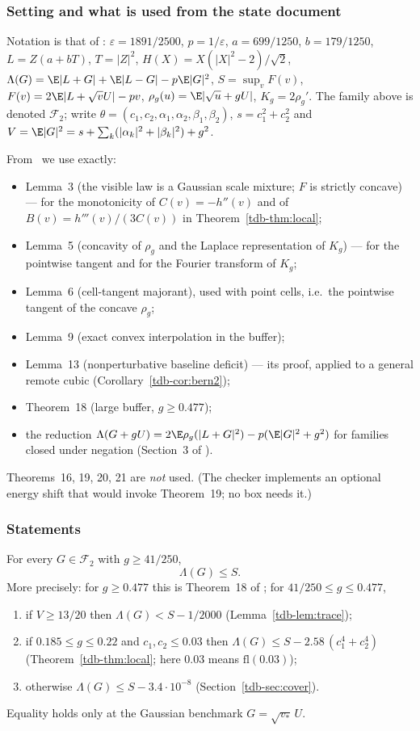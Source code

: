 \subsubsection{Setting and what is used from the state document}
Notation is that of \Sd: $\varepsilon=1891/2500$, $p=1/\varepsilon$, $a=699/1250$, $b=179/1250$, $L=Z(a+bT)$, $T=|Z|^2$,
$H(X)=X(|X|^2-2)/\sqrt2$, $\Lambda(G)=\E|L+G|+\E|L-G|-p\E|G|^2$, $S=\sup_vF(v)$, $F(v)=2\E|L+\sqrt vU|-pv$,
$\rho_g(u)=\E|\sqrt u+gU|$, $K_g=2\rho_g'$. The family above is denoted $\mathcal F_2$; write $\theta=(c_1,c_2,\alpha_1,\alpha_2,\beta_1,\beta_2)$,
$s=c_1^2+c_2^2$ and $V=\E|G|^2=s+\sum_k(|\alpha_k|^2+|\beta_k|^2)+g^2$.

From \Sd\ we use exactly:
\begin{itemize}
\item Lemma~3 (the visible law is a Gaussian scale mixture; $F$ is strictly concave) --- for the monotonicity of $C(v)=-h''(v)$ and
of $B(v)=h'''(v)/(3C(v))$ in Theorem~\ref{tdb-thm:local};
\item Lemma~5 (concavity of $\rho_g$ and the Laplace representation of $K_g$) --- for the pointwise tangent and for the Fourier transform of $K_g$;
\item Lemma~6 (cell-tangent majorant), used with point cells, i.e.\ the pointwise tangent of the concave $\rho_g$;
\item Lemma~9 (exact convex interpolation in the buffer);
\item Lemma~13 (nonperturbative baseline deficit) --- its proof, applied to a general remote cubic (Corollary~\ref{tdb-cor:bern2});
\item Theorem~18 (large buffer, $g\ge0.477$);
\item the reduction $\Lambda(G+gU)=2\E\rho_g(|L+G|^2)-p(\E|G|^2+g^2)$ for families closed under negation (Section~3 of \Sd).
\end{itemize}
Theorems~16, 19, 20, 21 are \emph{not} used. (The checker implements an optional energy shift that would invoke Theorem~19; no box needs it.)

\subsubsection{Statements}

\begin{theorem}\label{tdb-thm:A}
For every $G\in\mathcal F_2$ with $g\ge41/250$,
\[
\Lambda(G)\le S .
\]
More precisely: for $g\ge0.477$ this is Theorem~18 of \Sd; for $41/250\le g\le0.477$,
\begin{enumerate}
\item if $V\ge13/20$ then $\Lambda(G)<S-1/2000$ (Lemma~\ref{tdb-lem:trace});
\item if $0.185\le g\le0.22$ and $c_1,c_2\le0.03$ then $\Lambda(G)\le S-2.58\,(c_1^4+c_2^4)$ (Theorem~\ref{tdb-thm:local}; here $0.03$ means $\mathrm{fl}(0.03)$);
\item otherwise $\Lambda(G)\le S-3.4\cdot10^{-8}$ (Section~\ref{tdb-sec:cover}).
\end{enumerate}
Equality holds only at the Gaussian benchmark $G=\sqrt{v_*}\,U$.
\end{theorem}

